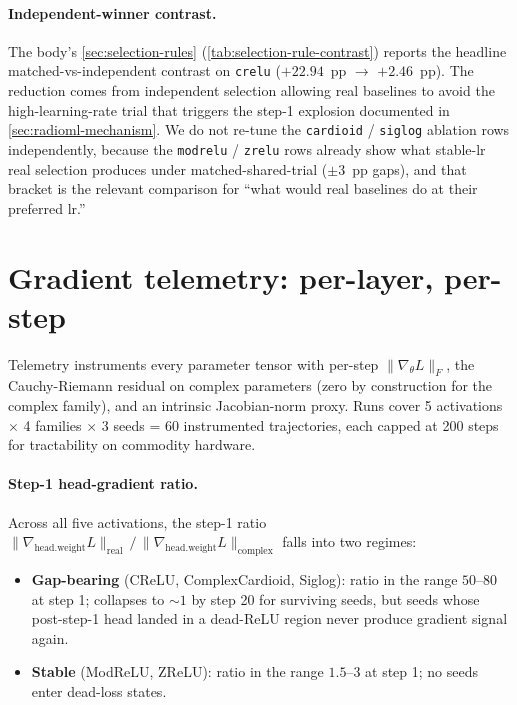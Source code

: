 \documentclass{article}
\providecommand{\Cref}[1]{\autoref{#1}}
\newcommand{\code}[1]{\texttt{#1}}
\begin{document}
\paragraph{Independent-winner contrast.} The body's
\Cref{sec:selection-rules} (\Cref{tab:selection-rule-contrast})
reports the headline matched-vs-independent contrast on \code{crelu}
($+22.94$~pp $\to$ $+2.46$~pp). The reduction comes from independent
selection allowing real baselines to avoid the high-learning-rate trial that
triggers the step-1 explosion documented in
\Cref{sec:radioml-mechanism}. We do not re-tune the
\code{cardioid} / \code{siglog} ablation rows independently, because
the \code{modrelu} / \code{zrelu} rows already show what stable-lr
real selection produces under matched-shared-trial ($\pm 3$~pp gaps),
and that bracket is the relevant comparison for ``what would real
baselines do at their preferred lr.''

\section{Gradient telemetry: per-layer, per-step}
\label{app:telemetry}

Telemetry instruments every parameter tensor with per-step
$\|\nabla_\theta L\|_F$, the Cauchy-Riemann residual on complex
parameters (zero by construction for the complex family), and an
intrinsic Jacobian-norm proxy. Runs cover 5 activations
$\times$ 4 families $\times$ 3 seeds = 60 instrumented trajectories,
each capped at 200 steps for tractability on commodity hardware.

\paragraph{Step-1 head-gradient ratio.} Across all five activations,
the step-1 ratio
$\|\nabla_{\text{head.weight}} L\|_{\text{real}} \,/\,
\|\nabla_{\text{head.weight}} L\|_{\text{complex}}$
falls into two regimes:

\begin{itemize}
  \item \textbf{Gap-bearing} (CReLU, ComplexCardioid, Siglog): ratio
    in the range $50$--$80$ at step 1; collapses to $\sim 1$ by step
    20 for surviving seeds, but seeds whose post-step-1 head landed in
    a dead-ReLU region never produce gradient signal again.
  \item \textbf{Stable} (ModReLU, ZReLU): ratio in the range
    $1.5$--$3$ at step 1; no seeds enter dead-loss states.
\end{itemize}
\end{document}
